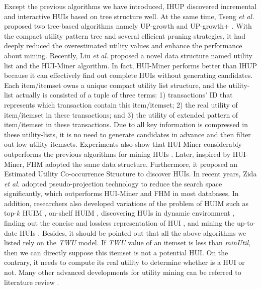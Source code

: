 \documentclass[journal]{IEEEtran}
\begin{document}
Except the previous algorithms we have introduced, IHUP \cite{ahmed2009efficient} discovered incremental and interactive HUIs based on tree structure well. At the same time, Tseng \textit{et al.} proposed two tree-based algorithms namely UP-growth \cite{tseng2010up} and UP-growth+ \cite{tseng2012efficient}. With the compact utility pattern tree and several efficient pruning strategies, it had deeply reduced the overestimated utility values and enhance the performance about mining. Recently, Liu \textit{et al.} \cite{liu2012mining} proposed a novel data structure named utility list and the HUI-Miner algorithm. In fact, HUI-Miner performs better than IHUP because it can effectively find out complete HUIs without generating candidates. Each item/itemset owns a unique compact utility list structure, and the utility-list actually is consisted of a tuple of three terms: 1) transactions' ID that represents which transaction contain this item/itemset; 2) the real utility of item/itemset in these transactions; and 3) the utility of extended pattern of item/itemset in these transactions. Due to all key information is compressed in these utility-lists, it is no need to generate candidates in advance and then filter out low-utility itemsets. Experiments also show that HUI-Miner considerably outperforms the previous algorithms for mining HUIs \cite{liu2012mining}. Later, inspired by HUI-Miner, FHM \cite{fournier2014fhm} adopted the same data structure. Furthermore, it proposed an Estimated Utility Co-occurrence Structure to discover HUIs. In recent years, Zida \textit{et al.} \cite{zida2017efim} adopted pseudo-projection technology to reduce the search space significantly, which outperforms HUI-Miner and FHM in most databases. In addition, researchers also developed variations of the problem of HUIM such as top-$k$ HUIM \cite{gan2020tophui,tseng2015efficient}, on-shelf HUIM \cite{chen2020osumi,lan2011discovery}, discovering HUIs in dynamic environment \cite{gan2018survey,lin2015fast}, finding out the concise and lossless representation of HUI \cite{tseng2014efficient}, and mining the up-to-date HUIs \cite{lin2015efficient}. Besides, it should be pointed out that all the above algorithms we listed rely on the \textit{TWU} model. If \textit{TWU} value of an itemset is less than \textit{minUtil}, then we can directly suppose this itemset is not a potential HUI. On the contrary, it needs to compute its real utility to determine whether is a HUI or not. Many other advanced developments for utility mining can be referred to literature review \cite{gan2021survey}.
\end{document}
